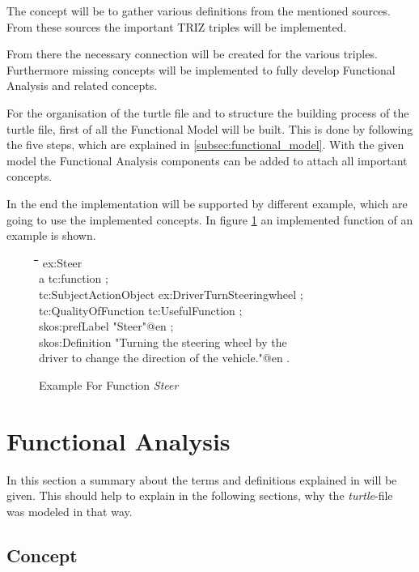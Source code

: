 \documentclass[11pt,a4paper]{article}
\newenvironment{code}{\tt \begin{tabbing}
\hskip12pt\=\hskip12pt\=\hskip12pt\=\hskip12pt\=\hskip5cm\=\hskip5cm\=\kill}
{\end{tabbing}}
\begin{document}
The concept will be to gather various definitions from the mentioned sources.
From these sources the important TRIZ triples will be implemented.

From there the necessary connection will be created for the various triples.
Furthermore missing concepts will be implemented to fully develop Functional
Analysis and related concepts.

For the organisation of the turtle file and to structure the building process
of the turtle file, first of all the Functional Model will be built.  This is
done by following the five steps, which are explained in
\ref{subsec:functional_model}.  With the given model the Functional Analysis
components can be added to attach all important concepts.

In the end the implementation will be supported by different example, which
are going to use the implemented concepts.  In figure
\ref{fig:example_conceptionalism} an implemented function of an example is
shown.

\begin{figure}[ht]
  \centering
  \begin{code}
    ex:Steer\\
    \> a tc:function ;\\
    \> tc:SubjectActionObject ex:DriverTurnSteeringwheel ;\\
    \> tc:QualityOfFunction tc:UsefulFunction ;\\
    \> skos:prefLabel "Steer"@en ;\\
    \> skos:Definition "Turning the steering wheel by the\\
    \> \> driver to change the direction of the vehicle."@en .
  \end{code}
  \caption{Example For Function \textit{Steer}}
  \label{fig:example_conceptionalism}
\end{figure}

\section{Functional Analysis}
\label{sec:functional_analysis}

In this section a summary about the terms and definitions explained in
\cite{KS} will be given.  This should help to explain in the following
sections, why the \textit{turtle}-file was modeled in that way.

\subsection{Concept}
\end{document}
